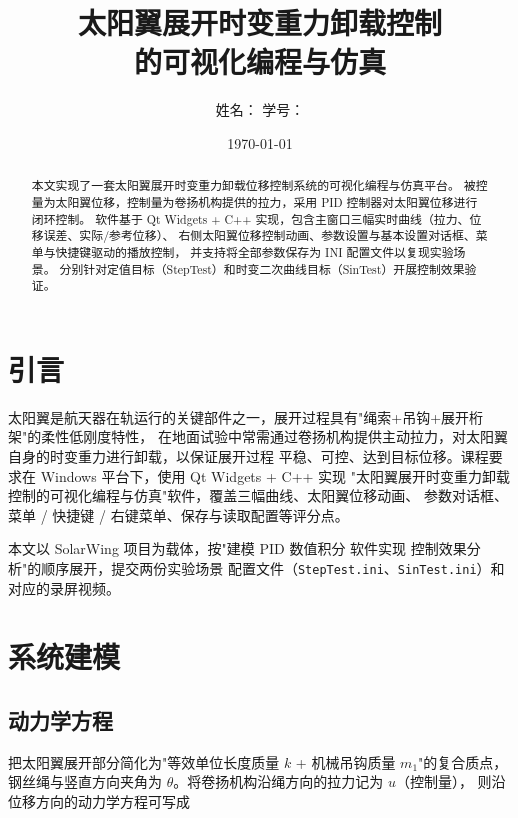 \documentclass[UTF8, a4paper, fontset=none]{ctexart}
\title{太阳翼展开时变重力卸载控制\\的可视化编程与仿真}
\author{姓名：\underline{\hspace{2.5cm}} \quad 学号：\underline{\hspace{3cm}}}
\date{\today}
\begin{document}
\maketitle

\begin{abstract}
本文实现了一套太阳翼展开时变重力卸载位移控制系统的可视化编程与仿真平台。
被控量为太阳翼位移，控制量为卷扬机构提供的拉力，采用 PID 控制器对太阳翼位移进行闭环控制。
软件基于 Qt Widgets + C++ 实现，包含主窗口三幅实时曲线（拉力、位移误差、实际/参考位移）、
右侧太阳翼位移控制动画、参数设置与基本设置对话框、菜单与快捷键驱动的播放控制，
并支持将全部参数保存为 INI 配置文件以复现实验场景。
分别针对定值目标（StepTest）和时变二次曲线目标（SinTest）开展控制效果验证。
\end{abstract}

\tableofcontents
\newpage

\section{引言}

太阳翼是航天器在轨运行的关键部件之一，展开过程具有"绳索+吊钩+展开桁架"的柔性低刚度特性，
在地面试验中常需通过卷扬机构提供主动拉力，对太阳翼自身的时变重力进行卸载，以保证展开过程
平稳、可控、达到目标位移。课程要求在 Windows 平台下，使用 Qt Widgets + C++ 实现
"太阳翼展开时变重力卸载控制的可视化编程与仿真"软件，覆盖三幅曲线、太阳翼位移动画、
参数对话框、菜单 / 快捷键 / 右键菜单、保存与读取配置等评分点。

本文以 SolarWing 项目为载体，按"建模 \textrightarrow{} PID \textrightarrow{} 数值积分
\textrightarrow{} 软件实现 \textrightarrow{} 控制效果分析"的顺序展开，提交两份实验场景
配置文件（\texttt{StepTest.ini}、\texttt{SinTest.ini}）和对应的录屏视频。

\section{系统建模}

\subsection{动力学方程}

把太阳翼展开部分简化为"等效单位长度质量 $k$ + 机械吊钩质量 $m_1$"的复合质点，
钢丝绳与竖直方向夹角为 $\theta$。将卷扬机构沿绳方向的拉力记为 $u$（控制量），
则沿位移方向的动力学方程可写成
\end{document}
